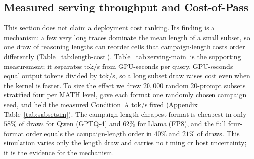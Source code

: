 \documentclass[11pt,a4paper]{article}
\begin{document}
\subsection{Measured serving throughput and Cost-of-Pass}
\label{sec:serving-results}
This section does not claim a deployment cost ranking. Its finding is a mechanism: a few very long traces dominate the mean length of a small subset, so one draw of reasoning lengths can reorder cells that campaign-length costs order differently (Table~\ref{tab:length-cost}). Table~\ref{tab:serving-main} is the supporting measurement; it separates tok/s from GPU-seconds per query. GPU-seconds equal output tokens divided by tok/s, so a long subset draw raises cost even when the kernel is faster. To size the effect we drew $20{,}000$ random 20-prompt subsets stratified four per MATH level, gave each format one randomly chosen campaign seed, and held the measured Condition~A tok/s fixed (Appendix Table~\ref{tab:subsetsim}). The campaign-length cheapest format is cheapest in only $58\%$ of draws for Qwen (GPTQ-4) and $62\%$ for Llama (FP8), and the full four-format order equals the campaign-length order in $40\%$ and $21\%$ of draws. This simulation varies only the length draw and carries no timing or host uncertainty; it is the evidence for the mechanism.
\end{document}
